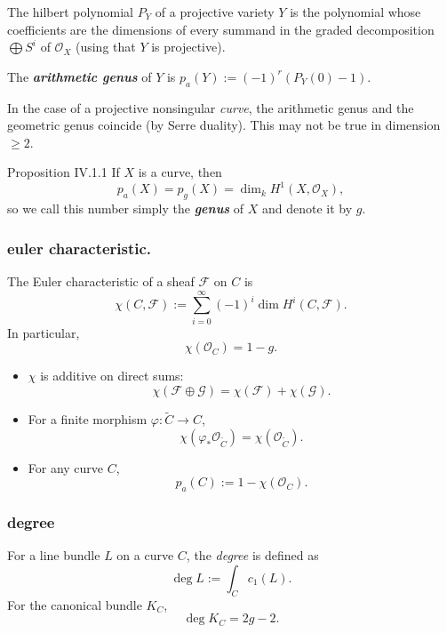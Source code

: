 \begin{defn}[p. 54]\leavevmode
The hilbert polynomial \(P_Y\) of a projective variety  \(Y\) is the polynomial whose coefficients are the dimensions of every summand in the graded decomposition \(\bigoplus S^i\) of \(\mathcal{O}_X\) (using that \(Y\) is projective).

The \textit{\textbf{arithmetic genus}} of \(Y\) is \(p_a(Y):=(-1)^{r}(P_Y(0)-1).\)
\end{defn}

\begin{remark}\leavevmode
	In the case of a projective nonsingular \textit{curve}, the arithmetic genus and the geometric genus coincide (by Serre duality). This may not be true in dimension \(\geq 2\).
\end{remark}

\begin{thing4}{Proposition IV.1.1}\label{prop:IV.1.1}\leavevmode
If \(X\) is a curve, then
\[p_a(X)=p_g(X)=\dim_kH^{1}(X,\mathcal{O}_X),\]
so we call this number simply the \textit{\textbf{genus}} of \(X\) and denote it by \(g\).
\end{thing4}




\subsubsection{euler characteristic.}
The Euler characteristic of a sheaf \( \mathcal{F} \) on \( C \) is
\[
\chi(C, \mathcal{F}) := \sum_{i=0}^\infty (-1)^i \dim H^i(C, \mathcal{F}).
\]
In particular,
\[
\chi(\mathcal{O}_C) = 1 - g.
\]
\begin{itemize}
  \item \(\chi\) is additive on direct sums:
  \[
  \chi(\mathcal{F} \oplus \mathcal{G}) = \chi(\mathcal{F}) + \chi(\mathcal{G}).
  \]
  \item For a finite morphism \( \varphi: \widetilde{C} \to C \),
  \[
  \chi(\varphi_*\mathcal{O}_{\widetilde{C}}) = \chi(\mathcal{O}_{\widetilde{C}}).
  \]
  \item For any curve \( C \),
  \[
  p_a(C) := 1 - \chi(\mathcal{O}_C).
  \]
\end{itemize}

\subsubsection{degree}
For a line bundle \( L \) on a curve \( C \), the \emph{degree} is defined as
\[
\deg L := \int_C c_1(L).
\]
For the canonical bundle \( K_C \),
\[
\deg K_C = 2g - 2.
\]

